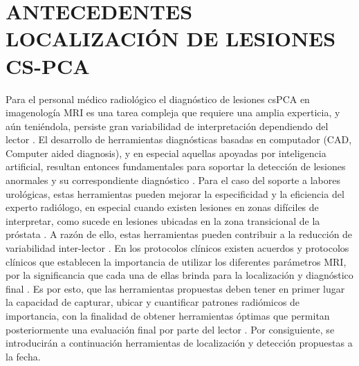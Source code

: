 \section{ANTECEDENTES LOCALIZACIÓN DE LESIONES CS-PCA}\label{sec:localiza_pca}Para el personal médico radiológico el diagnóstico de lesiones csPCA en imagenología MRI es una tarea compleja que requiere una amplia experticia, y aún teniéndola, persiste gran variabilidad de interpretación dependiendo del lector . El desarrollo de herramientas diagnósticas basadas en computador (CAD, Computer aided diagnosis), y en especial aquellas apoyadas por inteligencia artificial, resultan entonces fundamentales para soportar la detección de lesiones anormales y su correspondiente diagnóstico . Para el caso del soporte a labores urológicas, estas herramientas pueden mejorar la especificidad y la eficiencia del experto radiólogo, en especial cuando existen lesiones en zonas difíciles de interpretar, como sucede en lesiones ubicadas en la zona transicional de la próstata . A razón de ello, estas herramientas pueden contribuir a la reducción de variabilidad inter-lector . En los protocolos clínicos existen acuerdos y protocolos clínicos que establecen la importancia de utilizar los diferentes parámetros MRI, por la significancia que cada una de ellas brinda para la localización y diagnóstico final . Es por esto, que las herramientas propuestas deben tener en primer lugar la capacidad de capturar, ubicar y cuantificar patrones radiómicos de importancia, con la finalidad de obtener herramientas óptimas que permitan posteriormente una evaluación final por parte del lector . Por consiguiente, se introducirán a continuación herramientas de localización y detección propuestas a la fecha.\par


